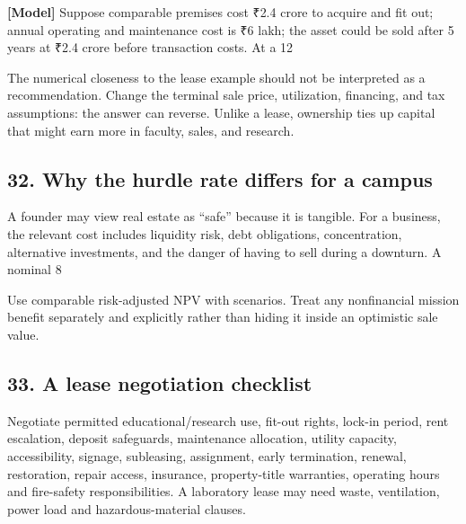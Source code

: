 \textbf{[Model]} Suppose comparable premises cost \textnormal{₹}2.4 crore to acquire and fit out; annual operating and maintenance cost is \textnormal{₹}6 lakh; the asset could be sold after 5 years at \textnormal{₹}2.4 crore before transaction costs. At a 12%

The numerical closeness to the lease example should not be interpreted as a recommendation. Change the terminal sale price, utilization, financing, and tax assumptions: the answer can reverse. Unlike a lease, ownership ties up capital that might earn more in faculty, sales, and research.


\subsection{32. Why the hurdle rate differs for a campus}

A founder may view real estate as ``safe'' because it is tangible. For a business, the relevant cost includes liquidity risk, debt obligations, concentration, alternative investments, and the danger of having to sell during a downturn. A nominal 8%

Use comparable risk-adjusted NPV with scenarios. Treat any nonfinancial mission benefit separately and explicitly rather than hiding it inside an optimistic sale value.


\subsection{33. A lease negotiation checklist}

Negotiate permitted educational/research use, fit-out rights, lock-in period, rent escalation, deposit safeguards, maintenance allocation, utility capacity, accessibility, signage, subleasing, assignment, early termination, renewal, restoration, repair access, insurance, property-title warranties, operating hours and fire-safety responsibilities. A laboratory lease may need waste, ventilation, power load and hazardous-material clauses.

